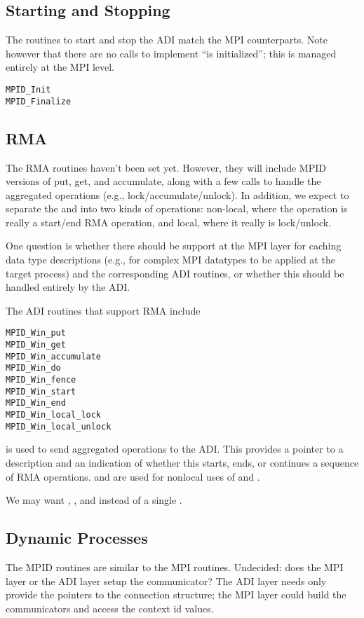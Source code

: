 \subsection{Starting and Stopping}
The routines to start and stop the ADI match the MPI counterparts.
Note however that there are no calls to implement ``is initialized'';
this is managed entirely at the MPI level.
\begin{verbatim}
MPID_Init
MPID_Finalize
\end{verbatim}

\subsection{RMA}
The RMA routines haven't been set yet.  However, they will include
MPID versions of put, get, and accumulate, along with a few calls to
handle the aggregated operations (e.g., lock/accumulate/unlock).
In addition, we expect to separate the  and
 into two kinds of operations: non-local, where
the operation is really a start/end RMA operation, and local, where it
really is lock/unlock.

One question is whether there should be support at the MPI layer for
caching data type descriptions (e.g., for complex MPI datatypes to be
applied at the target process) and the corresponding ADI routines, or
whether this should be handled entirely by the ADI.

The ADI routines that support RMA include
\begin{verbatim}
MPID_Win_put
MPID_Win_get
MPID_Win_accumulate
MPID_Win_do
MPID_Win_fence
MPID_Win_start
MPID_Win_end
MPID_Win_local_lock
MPID_Win_local_unlock
\end{verbatim}
 is used to send aggregated operations to the ADI.  This
provides a pointer to a description and an indication of whether this starts,
ends, or continues a sequence of RMA operations.   and
 are used for nonlocal uses of  and .

We may want , , and
 instead of a single .

\subsection{Dynamic Processes}
The MPID routines are similar to the MPI routines.  Undecided: does
the MPI layer or the ADI layer setup the communicator?  The ADI layer
needs only provide the pointers to the connection structure; the MPI
layer could build the communicators and access the context id values.

